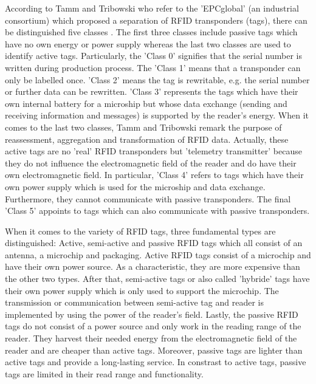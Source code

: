 According to Tamm and Tribowski \cite[p.15 ff.]{fokus} who refer to the 'EPCglobal' (an industrial consortium) which proposed a separation of RFID transponders (tags), there can be distinguished five classes \label{classes}. The first three classes include passive tags which have no own energy or power supply whereas the last two classes are used to identify active tags. Particularly, the 'Class 0' signifies that the serial number is written during production process. The 'Class 1' means that a transponder can only be labelled once. 'Class 2' means the tag is rewritable, e.g. the serial number or further data can be rewritten. 'Class 3' represents the tags which have their own internal battery for a microship but whose data exchange (sending and receiving information and messages) is supported by the reader's energy. When it comes to the last two classes, Tamm and Tribowski remark the purpose of reassessment, aggregation and transformation of RFID data. Actually, these active tags are no 'real' RFID transponders but 'telemetry transmitter' because they do not influence the electromagnetic field of the reader and do have their own electromagnetic field. In particular, 'Class 4' refers to tags which have their own power supply which is used for the microship and data exchange. Furthermore, they cannot communicate with passive transponders. The final 'Class 5' appoints to tags which can also communicate with passive transponders. 

When it comes to the variety of RFID tags, three fundamental types are distinguished: Active, semi-active and passive RFID tags \cite{henrici} which all consist of an antenna, a microchip and packaging. Active RFID tags consist of a microchip and have their own power source. As a characteristic, they are more expensive than the other two types. After that, semi-active tags or also called 'hybride' tags have their own power supply which is only used to support the microchip. The transmission or communication between semi-active tag and reader is implemented by using the power of the reader's field. Lastly, the passive RFID tags do not consist of a power source and only work in the reading range of the reader. They harvest their needed energy from the electromagnetic field of the reader and are cheaper than active tags. Moreover, passive tags are lighter than active tags and provide a long-lasting service. In constrast to active tags, passive tags are limited in their read range and functionality.

